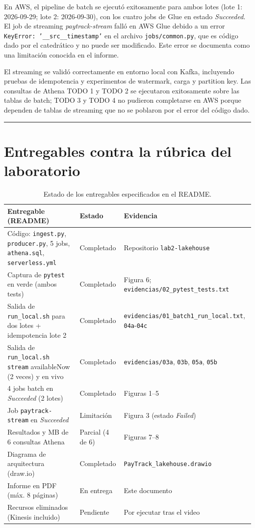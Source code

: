 ﻿\documentclass[11pt,a4paper]{article}
\begin{document}
En AWS, el pipeline de batch se ejecutó exitosamente para ambos lotes (lote 1: 2026-09-29; lote 2: 2026-09-30), con los cuatro jobs de Glue en estado \emph{Succeeded}. El job de streaming \emph{paytrack-stream} falló en AWS Glue debido a un error \texttt{KeyError: '\_\_src\_\_timestamp'} en el archivo \texttt{jobs/common.py}, que es código dado por el catedrático y no puede ser modificado. Este error se documenta como una limitación conocida en el informe.

El streaming se validó correctamente en entorno local con Kafka, incluyendo pruebas de idempotencia y experimentos de watermark, carga y partition key. Las consultas de Athena TODO 1 y TODO 2 se ejecutaron exitosamente sobre las tablas de batch; TODO 3 y TODO 4 no pudieron completarse en AWS porque dependen de tablas de streaming que no se poblaron por el error del código dado.

\vspace{0.5em}
\hrule
\vspace{0.8em}

\section{Entregables contra la rúbrica del laboratorio}

\begin{table}[h]
\centering
\small
\begin{tabular}{p{} p{} p{}}
\toprule
\textbf{Entregable (README)} & \textbf{Estado} & \textbf{Evidencia} \\
\midrule
Código: \texttt{ingest.py}, \texttt{producer.py}, 5 jobs, \texttt{athena.sql}, \texttt{serverless.yml} & Completado & Repositorio \texttt{lab2-lakehouse} \\
Captura de \texttt{pytest} en verde (ambos tests) & Completado & Figura 6; \texttt{evidencias/02\_pytest\_tests.txt} \\
Salida de \texttt{run\_local.sh} para dos lotes + idempotencia lote 2 & Completado & \texttt{evidencias/01\_batch1\_run\_local.txt}, \texttt{04a}-\texttt{04c} \\
Salida de \texttt{run\_local.sh stream} availableNow (2 veces) y en vivo & Completado & \texttt{evidencias/03a}, \texttt{03b}, \texttt{05a}, \texttt{05b} \\
4 jobs batch en \emph{Succeeded} (2 lotes) & Completado & Figuras 1--5 \\
Job \texttt{paytrack-stream} en \emph{Succeeded} & Limitación & Figura 3 (estado \emph{Failed}) \\
Resultados y MB de 6 consultas Athena & Parcial (4 de 6) & Figuras 7--8 \\
Diagrama de arquitectura (draw.io) & Completado & \texttt{PayTrack\_lakehouse.drawio} \\
Informe en PDF (máx. 8 páginas) & En entrega & Este documento \\
Recursos eliminados (Kinesis incluido) & Pendiente & Por ejecutar tras el video \\
\bottomrule
\end{tabular}
\caption{Estado de los entregables especificados en el README.}
\label{tab:entregables}
\end{table}
\end{document}

